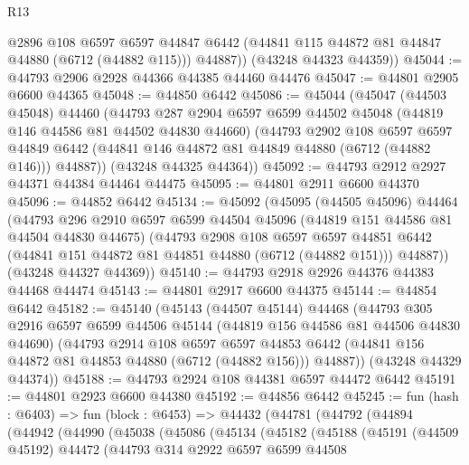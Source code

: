 \begin{lexlean}{R13}
\begin{coremodule}
          @2896
          @108
          @6597
          @6597
          @44847
          @6442
          (@44841 @115 @44872 @81 @44847 @44880 (@6712 (@44882 @115)))
          @44887))
      (@43248 @44323 @44359))
@45044 := @44793 @2906 @2928 @44366 @44385 @44460 @44476
@45047 := @44801 @2905 @6600 @44365
@45048 := @44850 @6442
@45086 := @45044
    (@45047
      (@44503 @45048)
      @44460
      (@44793
        @287
        @2904
        @6597
        @6599
        @44502
        @45048
        (@44819 @146 @44586 @81 @44502 @44830 @44660)
        (@44793
          @2902
          @108
          @6597
          @6597
          @44849
          @6442
          (@44841 @146 @44872 @81 @44849 @44880 (@6712 (@44882 @146)))
          @44887))
      (@43248 @44325 @44364))
@45092 := @44793 @2912 @2927 @44371 @44384 @44464 @44475
@45095 := @44801 @2911 @6600 @44370
@45096 := @44852 @6442
@45134 := @45092
    (@45095
      (@44505 @45096)
      @44464
      (@44793
        @296
        @2910
        @6597
        @6599
        @44504
        @45096
        (@44819 @151 @44586 @81 @44504 @44830 @44675)
        (@44793
          @2908
          @108
          @6597
          @6597
          @44851
          @6442
          (@44841 @151 @44872 @81 @44851 @44880 (@6712 (@44882 @151)))
          @44887))
      (@43248 @44327 @44369))
@45140 := @44793 @2918 @2926 @44376 @44383 @44468 @44474
@45143 := @44801 @2917 @6600 @44375
@45144 := @44854 @6442
@45182 := @45140
    (@45143
      (@44507 @45144)
      @44468
      (@44793
        @305
        @2916
        @6597
        @6599
        @44506
        @45144
        (@44819 @156 @44586 @81 @44506 @44830 @44690)
        (@44793
          @2914
          @108
          @6597
          @6597
          @44853
          @6442
          (@44841 @156 @44872 @81 @44853 @44880 (@6712 (@44882 @156)))
          @44887))
      (@43248 @44329 @44374))
@45188 := @44793 @2924 @108 @44381 @6597 @44472 @6442
@45191 := @44801 @2923 @6600 @44380
@45192 := @44856 @6442
@45245 := fun (hash : @6403) =>
  fun (block : @6453) =>
  @44432
    (@44781
      (@44792
        (@44894
          (@44942
            (@44990
              (@45038
                (@45086
                  (@45134
                    (@45182
                      (@45188
                        (@45191
                          (@44509 @45192)
                          @44472
                          (@44793
                            @314
                            @2922
                            @6597
                            @6599
                            @44508

\end{coremodule}
\end{lexlean}
